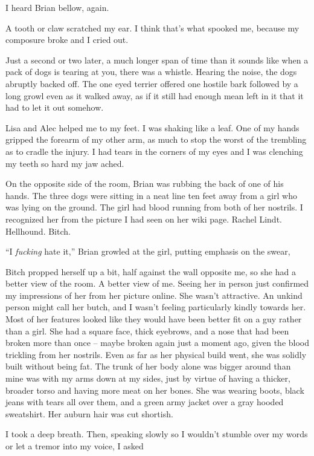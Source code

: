  I heard Brian bellow, again.

A tooth or claw scratched my ear. I think that's what spooked me, because my composure broke and I cried out.

Just a second or two later, a much longer span of time than it sounds like when a pack of dogs is tearing at you, there was a whistle. Hearing the noise, the dogs abruptly backed off. The one eyed terrier offered one hostile bark followed by a long growl even as it walked away, as if it still had enough mean left in it that it had to let it out somehow.

Lisa and Alec helped me to my feet. I was shaking like a leaf. One of my hands gripped the forearm of my other arm, as much to stop the worst of the trembling as to cradle the injury. I had tears in the corners of my eyes and I was clenching my teeth so hard my jaw ached.

On the opposite side of the room, Brian was rubbing the back of one of his hands. The three dogs were sitting in a neat line ten feet away from a girl who was lying on the ground. The girl had blood running from both of her nostrils. I recognized her from the picture I had seen on her wiki page. Rachel Lindt. Hellhound. Bitch.

“I {\em fucking} hate it,” Brian growled at the girl, putting emphasis on the swear, 

Bitch propped herself up a bit, half against the wall opposite me, so she had a better view of the room. A better view of me. Seeing her in person just confirmed my impressions of her from her picture online. She wasn't attractive. An unkind person might call her butch, and I wasn't feeling particularly kindly towards her. Most of her features looked like they would have been better fit on a guy rather than a girl. She had a square face, thick eyebrows, and a nose that had been broken more than once -- maybe broken again just a moment ago, given the blood trickling from her nostrils. Even as far as her physical build went, she was solidly built without being fat. The trunk of her body alone was bigger around than mine was with my arms down at my sides, just by virtue of having a thicker, broader torso and having more meat on her bones. She was wearing boots, black jeans with tears all over them, and a green army jacket over a gray hooded sweatshirt. Her auburn hair was cut shortish.

I took a deep breath. Then, speaking slowly so I wouldn't stumble over my words or let a tremor into my voice, I asked 

